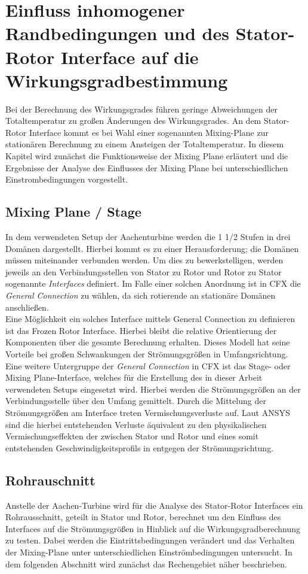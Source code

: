 \chapter{Einfluss inhomogener Randbedingungen und des Stator-Rotor Interface auf die Wirkungsgradbestimmung}
\label{cha:kanal}
Bei der Berechnung des Wirkungsgrades führen geringe Abweichungen der Totaltemperatur zu großen Änderungen des Wirkungsgrades. An dem Stator-Rotor Interface kommt es bei Wahl einer sogenannten Mixing-Plane zur stationären Berechnung zu einem Ansteigen der Totaltemperatur. In diesem Kapitel wird zunächst die Funktionsweise der Mixing Plane erläutert und die Ergebnisse der Analyse des Einflusses der Mixing Plane bei unterschiedlichen Einstrombedingungen vorgestellt.
\section{Mixing Plane / Stage}
In dem verwendeten Setup der Aachenturbine werden die 1 1/2 Stufen in drei Domänen dargestellt. Hierbei kommt es zu einer Herausforderung; die Domänen müssen miteinander verbunden werden. Um dies zu bewerkstelligen, werden jeweils an den Verbindungsstellen von Stator zu Rotor und Rotor zu Stator sogenannte \textit{Interfaces} definiert.
Im Falle einer solchen Anordnung ist in CFX die \textit{General Connection} zu wählen, da sich rotierende an stationäre Domänen anschließen.\\
Eine Möglichkeit ein solches Interface mittels General Connection zu definieren ist das Frozen Rotor Interface. Hierbei bleibt die relative Orientierung der Komponenten über die gesamte Berechnung erhalten. 
Dieses Modell hat seine Vorteile bei großen Schwankungen der Strömungsgrößen in Umfangsrichtung.\\
Eine weitere Untergruppe der \textit{General Connection} in CFX ist das Stage- oder Mixing Plane-Interface, welches für die Erstellung des in dieser Arbeit verwendeten Setups eingesetzt wird. Hierbei werden die Strömungsgrößen an der Verbindungsstelle über den Umfang gemittelt.
Durch die Mittelung der Strömungsgrößen am Interface treten Vermischungsverluste auf. Laut ANSYS sind die hierbei entstehenden Verluste äquivalent zu den physikalischen Vermischungseffekten der zwischen Stator und Rotor und eines somit entstehenden Geschwindigkeitsprofils in entgegen der Strömungsrichtung. \cite{Sharcnet1}

\section{Rohrauschnitt}
\label{sec:kanalgeo}
Anstelle der Aachen-Turbine wird für die Analyse des Stator-Rotor Interfaces ein Rohrausschnitt, geteilt in Stator und Rotor, berechnet um den Einfluss des Interfaces auf die Strömungsgrößen in Hinblick auf die Wirkungsgradberechnung zu testen. Dabei werden die Eintrittsbedingungen verändert und das Verhalten der Mixing-Plane unter unterschiedlichen Einströmbedingungen untersucht. In dem folgenden Abschnitt wird zunächst das Rechengebiet näher beschrieben.
